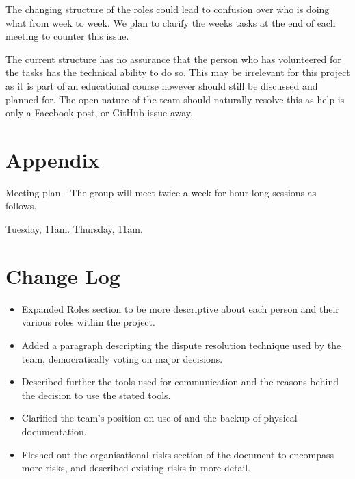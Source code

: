 \documentclass{l3deliverable}
\begin{document}
The changing structure of the roles could lead to confusion over who is
doing what from week to week. We plan to clarify the weeks tasks at the
end of each meeting to counter this issue.

The current structure has no assurance that the person who has volunteered
for the tasks has the technical ability to do so. This may be irrelevant
for this project as it is part of an educational course however should still
be discussed and planned for. The open nature of the team should naturally
resolve this as help is only a Facebook post, or GitHub issue away.

\pagebreak

\appendix

\section{Appendix}

Meeting plan - The group will meet twice a week for hour long sessions as follows.

Tuesday, 11am. Thursday, 11am.

\section{Change Log}

\begin{itemize}

\item Expanded Roles section to be more descriptive about each person and
their various roles within the project.

\item Added a paragraph descripting the dispute resolution technique used by
the team, democratically voting on major decisions.

\item Described further the tools used for communication and the reasons
behind the decision to use the stated tools.

\item Clarified the team's position on use of and the backup of physical
documentation.

\item Fleshed out the organisational risks section of the document to
encompass more risks, and described existing risks in more detail.

\end{itemize}
\end{document}
